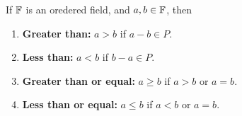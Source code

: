 \begin{definition}
  If $\mathbb{F}$ is an oredered field, and $a, b \in \mathbb{F}$, then
  \begin{enumerate}
    \item \textbf{Greater than: } $a > b$ if $a - b \in P$.
    \item \textbf{Less than: }$a < b$ if $b - a \in P$.
    \item \textbf{Greater than or equal: }$a \geq b$ if $a > b$ or $a = b$.
    \item \textbf{Less than or equal: }$a \leq b$ if $a < b$ or $a = b$.
  \end{enumerate}
\end{definition}


